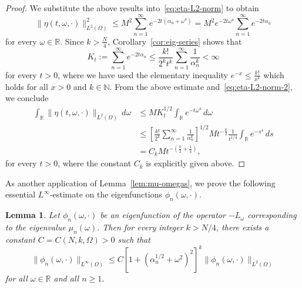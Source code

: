 \documentclass[a4paper, reqno,titlepage]{amsart}
\numberwithin{equation}{section}
\theoremstyle{plain}
\newtheorem{lemma}[theorem]{Lemma}
\theoremstyle{definition}
\theoremstyle{remark}
\newcommand{\NN}{\mathbb{N}}
\newcommand{\RR}{\mathbb{R}}
\begin{document}
\begin{proof}
 We substitute the above results into~\eqref{eq:eta-L2-norm} to obtain
 \begin{equation}
 \label{eq:eta-L2-norm-2}
 	\| \eta(t, \omega, \cdot) \|_{L^2(\Omega)}^2 \le M^2 \sum_{n=1}^\infty e^{-2t(\alpha_n+\omega^4)} = M^2 e^{-2t\omega^4} \sum_{n=1}^\infty e^{-2t\alpha_n}
 \end{equation}
 for every $\omega\in\RR$. Since $k>\frac{N}{4}$, Corollary~\ref{cor:eig-series} shows that
 \begin{equation*}
 	K_t := \sum_{n=1}^\infty e^{-2t\alpha_n} \le \frac{k!}{2^k t^k} \sum_{n=1}^\infty \frac{1}{\alpha_n^k} < \infty
 \end{equation*}
 for every $t>0$, where we have used the elementary inequality $e^{-x}\le\frac{k!}{x^k}$ which holds for all $x>0$ and $k\in\NN$. From the above estimate and~\eqref{eq:eta-L2-norm-2}, we conclude
 \begin{align*}
 	\int_\RR \|\eta(t,\omega,\cdot)\|_{L^2(\Omega)}\,d\omega &\le MK_t^{1/2} \int_\RR e^{-t\omega^4}\,d\omega \\
 	&\le \left[\frac{k!}{2^k}\sum_{n=1}^\infty\frac{1}{\alpha_n^k}\right]^{1/2} M t^{-\frac{k}{2}} \frac{1}{t^{1/4}} \int_\RR e^{-s^4}\,ds \\
 	&= C_k M t^{-(\frac{k}{2}+\frac{1}{4})},
 \end{align*}
 for every $t>0$, where the constant $C_k$ is explicitly given above.
\end{proof}

As another application of Lemma~\ref{lem:mu-omegas}, we prove the following essential $L^\infty$-estimate on the eigenfunctions $\phi_n(\omega,\cdot)$.
\begin{lemma}
  \label{lem:supnorm}
  Let $\phi_n(\omega, \cdot)$ be an eigenfunction of the operator $-L_\omega$ corresponding to the eigenvalue $\mu_n(\omega)$. Then for every integer $k>N/4$, there exists a constant $C = C(N, k, \Omega) > 0$ such that
  \begin{equation}
    \label{eq:supnorm}
    \| \phi_n(\omega, \cdot) \|_{L^\infty(\Omega)}
    \leq C \left[1+(\alpha_n^{1/2}+\omega^2)^2\right]^k\|\phi_n(\omega,\cdot)\|_{L^2(\Omega)}
  \end{equation}
  for all $\omega\in\RR$ and all $n \ge 1$.
\end{lemma}
\end{document}
